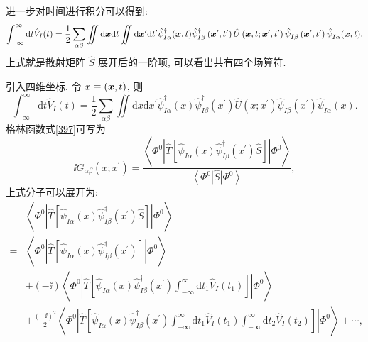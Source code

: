进一步对时间进行积分可以得到:
\begin{equation}
\int_{-\infty}^{\infty} \mathrm{d} t \hat{V}_{I}(t)=\frac{1}{2} \sum_{\alpha \beta} \iint \mathrm{d} \boldsymbol{x} \mathrm{d} t \iint \mathrm{d} \boldsymbol{x}^{\prime} \mathrm{d} t^{\prime} \hat{\psi}_{I \alpha}^{\dagger}(\boldsymbol{x}, t) \hat{\psi}_{I \beta}^{\dagger}\left(\boldsymbol{x}^{\prime}, t^{\prime}\right) \hat U\left(\boldsymbol{x}, t ; \boldsymbol{x}^{\prime}, t^{\prime}\right) \hat{\psi}^{}_{I \beta}\left(\boldsymbol{x}^{\prime}, t^{\prime}\right) \hat{\psi}^{}_{I \alpha}(\boldsymbol{x}, t) .
\end{equation}
上式就是散射矩阵 $\hat S$ 展开后的一阶项, 可以看出共有四个场算符. 

引入四维坐标, 令 $x\equiv (\boldsymbol{x}, t)$, 则
\begin{equation}
\int_{-\infty}^{\infty} \mathrm{d} t \hat{V}_{I}(t)=\frac{1}{2} \sum_{\alpha \beta} \iint \mathrm{d} {x} \mathrm{d} {x}^{\prime}  \hat{\psi}_{I \alpha}^{\dagger}(x) \hat{\psi}_{I \beta}^{\dagger}\left({x}^{\prime}\right) \hat U\left(x ; {x}^{\prime}\right) \hat{\psi}^{}_{I \beta}\left({x}^{\prime}\right) \hat{\psi}^{}_{I \alpha}(x) .
\end{equation}
格林函数式\eqref{397}可写为
\begin{equation}
\ii G_{\alpha \beta}\left(x ; {x}^{\prime}\right)=\frac{\left\langle\Phi^{0}\left|\hat{T}\left[\hat{\psi}^{}_{I \alpha}(x) \hat{\psi}_{I \beta}^{\dagger}\left({x}^{\prime}\right) \hat{S}\right]\right| \Phi^{0}\right\rangle}{\left\langle\Phi^{0}\right|\hat{S}\left| \Phi^{0}\right\rangle},
\end{equation}
上式分子可以展开为:
\begin{align}
&\left\langle\Phi^{0}\left|\hat{T}\left[\hat{\psi}^{}_{I \alpha}(x) \hat{\psi}^{\dagger}_{I \beta}\left(x^{\prime}\right) \hat{S}\right]\right| \Phi^{0}\right\rangle \nonumber\\
=&\left\langle\Phi^{0}\left|\hat{T}\left[\hat{\psi}^{}_{I \alpha}(x) \hat{\psi}^{\dagger}_{I \beta}\left(x^{\prime}\right)\right]\right| \Phi^{0}\right\rangle\nonumber \\
&+(-\ii)\left\langle\Phi^{0}\left|\hat{T}\left[\hat{\psi}^{}_{I \alpha}(x)\hat{\psi}^{\dagger}_{I \beta}\left(x^{\prime}\right) \int_{-\infty}^{\infty} \mathrm{d} t_1 \hat{V}_{I}(t_1)\right]\right| \Phi^{0}\right\rangle\nonumber \\
&+\frac{(-\ii)^{2}}{2}\left\langle\Phi^{0}\left|\hat{T}\left[\hat{\psi}^{}_{I \alpha}(x) \hat{\psi}^{\dagger}_{I \beta}\left(x^{\prime}\right) \int_{-\infty}^{\infty} \mathrm{d} t_{1} \hat{V}_{I}\left(t_{1}\right) \int_{-\infty}^{\infty} \mathrm{d} t_{2} \hat{V}_{I}\left(t_{2}\right)\right]\right| \Phi^{0}\right\rangle+\cdots,
\end{align}
